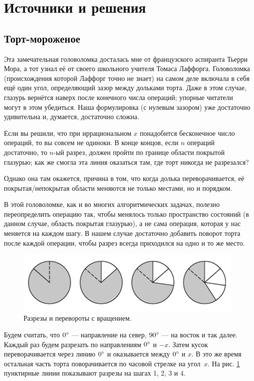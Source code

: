 \section*{Источники и решения}

\subsection*{Торт-мороженое}

Эта замечательная головоломка досталась мне от французского аспиранта Тьерри Мора,
а тот узнал её от своего школьного учителя Томаса Лаффорга.
Головоломка (происхождения которой Лаффорг точно не знает) на самом деле включала в себя ещё один угол, определяющий зазор между дольками торта.
Даже в этом случае, глазурь вернётся наверх после конечного числа операций;
упорные читатели могут в этом убедиться.
Наша формулировка (с нулевым зазором) уже достаточно удивительна и, думается, достаточно сложна.

Если вы решили, что при иррациональном $x$ понадобится бесконечное число операций, то вы совсем не одиноки.
В конце концов, если $n$ операций достаточно, то $n$-ый разрез, должен пройти по границе области покрытой глазурью;
как же смогла эта линия оказаться там, где торт никогда не разрезался?

Однако она там окажется, причина в том, что когда долька переворачивается, её покрытая/непокрытая области  меняются не только местами, но и порядком.

В этой головоломке, как и во многих алгоритмических задачах, полезно переопределить операцию так, чтобы менялось только пространство состояний (в данном случае, область покрытая глазурью), а не сама операция, которая у нас меняется на каждом шагу.
В нашем случае достаточно добавить поворот торта после каждой операции, чтобы разрез всегда приходился на одно и то же место.


\begin{figure}[htb!]
\centering
\includegraphics[scale=1]{pics/tort2}
\caption{Разрезы и перевороты с вращением.}
\label{pic:tort2}
\end{figure}

Будем считать, что $0\degree$ --- направление на север,
$90\degree$ --- на восток и так далее.
Каждый раз будем разрезать по направлениям $0\degree$ и $-x$.
Затем кусок переворачивается через линию $0\degree$ и оказывается между $0\degree$ и $x$.
В это же время остальная часть торта поворачивается по часовой стрелке на угол~$x$.
На рис. \ref{pic:tort2} пунктирные линии показывают разрезы на шагах 1, 2, 3 и 4.

